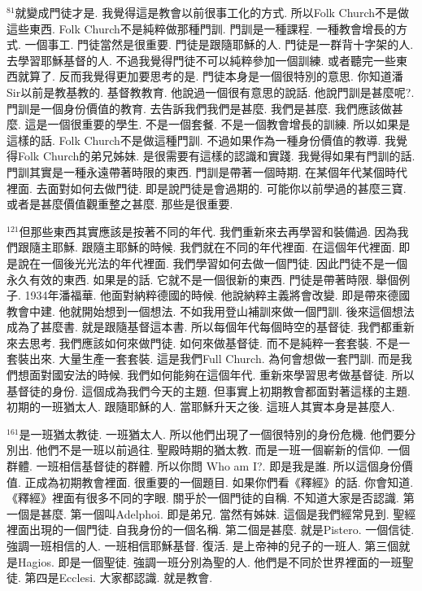 \documentclass{book}
\begin{document}
$^{81}$就變成門徒才是.
我覺得這是教會以前很事工化的方式.
所以Folk Church不是做這些東西.
Folk Church不是純粹做那種門訓.
門訓是一種課程.
一種教會增長的方式.
一個事工.
門徒當然是很重要.
門徒是跟隨耶穌的人.
門徒是一群背十字架的人.
去學習耶穌基督的人.
不過我覺得門徒不可以純粹參加一個訓練.
或者聽完一些東西就算了.
反而我覺得更加要思考的是.
門徒本身是一個很特別的意思.
你知道潘Sir以前是教基教的.
基督教教育.
他說過一個很有意思的說話.
他說門訓是甚麼呢?.
門訓是一個身份價值的教育.
去告訴我們我們是甚麼.
我們是甚麼.
我們應該做甚麼.
這是一個很重要的學生.
不是一個套餐.
不是一個教會增長的訓練.
所以如果是這樣的話.
Folk Church不是做這種門訓.
不過如果作為一種身份價值的教導.
我覺得Folk Church的弟兄姊妹.
是很需要有這樣的認識和實踐.
我覺得如果有門訓的話.
門訓其實是一種永遠帶著時限的東西.
門訓是帶著一個時期.
在某個年代某個時代裡面.
去面對如何去做門徒.
即是說門徒是會過期的.
可能你以前學過的甚麼三寶.
或者是甚麼價值觀重整之甚麼.
那些是很重要.

$^{121}$但那些東西其實應該是按著不同的年代.
我們重新來去再學習和裝備過.
因為我們跟隨主耶穌.
跟隨主耶穌的時候.
我們就在不同的年代裡面.
在這個年代裡面.
即是說在一個後光光法的年代裡面.
我們學習如何去做一個門徒.
因此門徒不是一個永久有效的東西.
如果是的話.
它就不是一個很新的東西.
門徒是帶著時限.
舉個例子.
1934年潘福華.
他面對納粹德國的時候.
他說納粹主義將會改變.
即是帶來德國教會中建.
他就開始想到一個想法.
不如我用登山補訓來做一個門訓.
後來這個想法成為了甚麼書.
就是跟隨基督這本書.
所以每個年代每個時空的基督徒.
我們都重新來去思考.
我們應該如何來做門徒.
如何來做基督徒.
而不是純粹一套套裝.
不是一套裝出來.
大量生產一套套裝.
這是我們Full Church.
為何會想做一套門訓.
而是我們想面對國安法的時候.
我們如何能夠在這個年代.
重新來學習思考做基督徒.
所以基督徒的身份.
這個成為我們今天的主題.
但事實上初期教會都面對著這樣的主題.
初期的一班猶太人.
跟隨耶穌的人.
當耶穌升天之後.
這班人其實本身是甚麼人.

$^{161}$是一班猶太教徒.
一班猶太人.
所以他們出現了一個很特別的身份危機.
他們要分別出.
他們不是一班以前過往.
聖殿時期的猶太教.
而是一班一個嶄新的信仰.
一個群體.
一班相信基督徒的群體.
所以你問 Who am I?.
即是我是誰.
所以這個身份價值.
正成為初期教會裡面.
很重要的一個題目.
如果你們看《釋經》的話.
你會知道.
《釋經》裡面有很多不同的字眼.
關乎於一個門徒的自稱.
不知道大家是否認識.
第一個是甚麼.
第一個叫Adelphoi.
即是弟兄.
當然有姊妹.
這個是我們經常見到.
聖經裡面出現的一個門徒.
自我身份的一個名稱.
第二個是甚麼.
就是Pistero.
一個信徒.
強調一班相信的人.
一班相信耶穌基督.
復活.
是上帝神的兒子的一班人.
第三個就是Hagios.
即是一個聖徒.
強調一班分別為聖的人.
他們是不同於世界裡面的一班聖徒.
第四是Ecclesi.
大家都認識.
就是教會.
\end{document}
